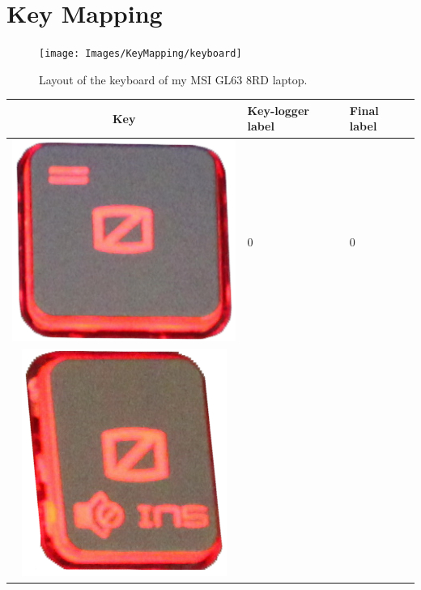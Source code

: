 \appendix
\chapter{Key Mapping}\label{chapter:keymapping}
\begin{figure}[h]
     \centering
     \texttt{[image: Images/KeyMapping/keyboard]}
     \caption{\footnotesize{Layout of the keyboard of my MSI GL63 8RD laptop.}}\label{keymapping:keyboard}
\end{figure}

\renewcommand{\arraystretch}{1.4}
\footnotesize
\vspace{0.5cm}
\begin{longtable}{|cll|}
\hline
\textbf{Key} & \textbf{Key-logger label} & \textbf{Final label}\\
\hline
\begin{minipage}[c]{.4\textwidth}
\vspace{0.2cm}
\includegraphics[scale=0.08]{Images/KeyMapping/0}
\vspace{0.2cm}
\end{minipage} & 0 & 0 \\
\hline
\multirow{2}{*}{
\begin{minipage}[c]{.4\textwidth}
\vspace{0.2cm}
\includegraphics[scale=0.08]{Images/KeyMapping/0_INSERT}

\end{minipage}}
\end{longtable}

